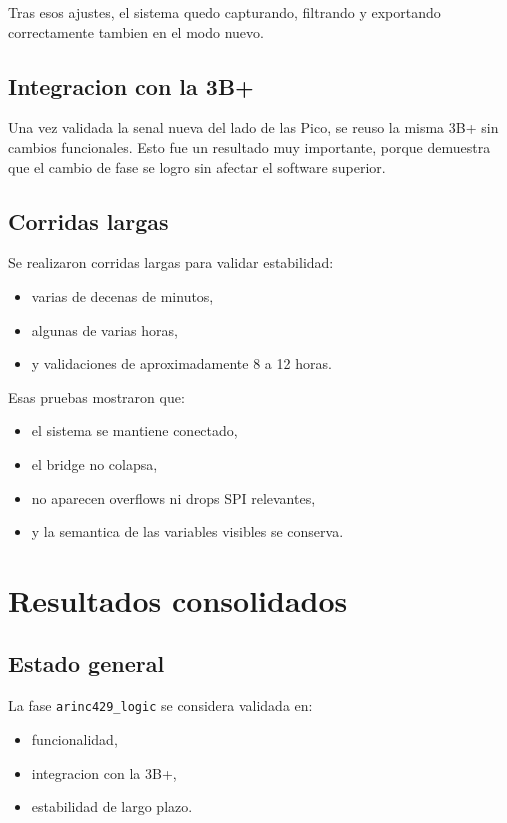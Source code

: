 \documentclass[12pt,a4paper,oneside]{report}
\begin{document}
Tras esos ajustes, el sistema quedo capturando, filtrando y exportando correctamente tambien en el modo nuevo.

\section{Integracion con la 3B+}

Una vez validada la senal nueva del lado de las Pico, se reuso la misma 3B+ sin cambios funcionales. Esto fue un resultado muy importante, porque demuestra que el cambio de fase se logro sin afectar el software superior.

\section{Corridas largas}

Se realizaron corridas largas para validar estabilidad:

\begin{itemize}[leftmargin=1.2cm]
    \item varias de decenas de minutos,
    \item algunas de varias horas,
    \item y validaciones de aproximadamente 8 a 12 horas.
\end{itemize}

Esas pruebas mostraron que:

\begin{itemize}[leftmargin=1.2cm]
    \item el sistema se mantiene conectado,
    \item el bridge no colapsa,
    \item no aparecen overflows ni drops SPI relevantes,
    \item y la semantica de las variables visibles se conserva.
\end{itemize}

\chapter{Resultados consolidados}

\section{Estado general}

La fase \texttt{arinc429\_logic} se considera validada en:

\begin{itemize}[leftmargin=1.2cm]
    \item funcionalidad,
    \item integracion con la 3B+,
    \item estabilidad de largo plazo.
\end{itemize}
\end{document}
